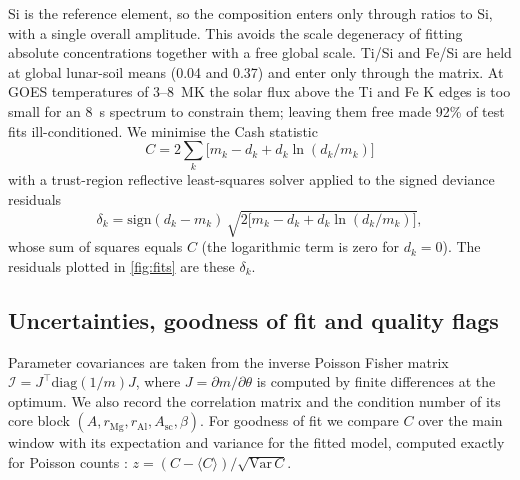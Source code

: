 Si is the reference element, so the composition enters only through ratios to Si, with a single overall amplitude. This avoids the scale degeneracy of fitting absolute concentrations together with a free global scale. Ti/Si and Fe/Si are held at global lunar-soil means (0.04 and 0.37) and enter only through the matrix. At GOES temperatures of 3--\SI{8}{MK} the solar flux above the Ti and Fe K edges is too small for an \SI{8}{s} spectrum to constrain them; leaving them free made 92\% of test fits ill-conditioned. We minimise the Cash statistic \citep{Cash1979}
\begin{equation}
C = 2\sum_k \big[m_k - d_k + d_k\ln(d_k/m_k)\big]
\label{eq:cash}
\end{equation}
with a trust-region reflective least-squares solver applied to the signed deviance residuals
\begin{equation}
\delta_k = \mathrm{sign}(d_k-m_k)\,\sqrt{2\big[m_k-d_k+d_k\ln(d_k/m_k)\big]},
\label{eq:devres}
\end{equation}
whose sum of squares equals $C$ (the logarithmic term is zero for $d_k=0$). The residuals plotted in \cref{fig:fits} are these $\delta_k$.

\subsection{Uncertainties, goodness of fit and quality flags}\label{sec:uncert}
Parameter covariances are taken from the inverse Poisson Fisher matrix $\mathcal{I}=J^\top\mathrm{diag}(1/m)J$, where $J=\partial m/\partial\theta$ is computed by finite differences at the optimum. We also record the correlation matrix and the condition number of its core block $(A,r_\mathrm{Mg},r_\mathrm{Al},A_\mathrm{sc},\beta)$. For goodness of fit we compare $C$ over the main window with its expectation and variance for the fitted model, computed exactly for Poisson counts \citep{Kaastra2017}: $z=(C-\langle C\rangle)/\sqrt{\mathrm{Var}\,C}$.

